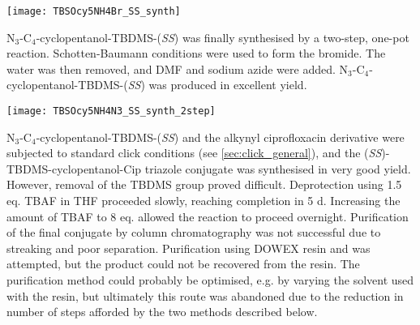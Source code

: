 \begin{scheme}[H]
	\begin{center}
		\texttt{[image: TBSOcy5NH4Br\_SS\_synth]}
		\caption{Attempted synthesis of Br-C$_4$-cyclopentanol-TBDMS-(\textit{SS}) . 
		a) , , , 0 $^{\circ}$C, 2 h. %
		\label{sch:TBSOcy5NH4Br_SS_synth}}
	\end{center}
\end{scheme}


N$_3$-C$_4$-cyclopentanol-TBDMS-(\textit{SS})  was finally synthesised by a two-step, one-pot reaction. Schotten-Baumann conditions were used to form the bromide. The water was then removed, and DMF and sodium azide were added. N$_3$-C$_4$-cyclopentanol-TBDMS-(\textit{SS})  was produced in excellent yield.

\begin{scheme}[H]
	\begin{center}
				
		\texttt{[image: TBSOcy5NH4N3\_SS\_synth\_2step]}
		\caption{
		Synthesis of N$_3$-C$_4$-cyclopentanol-TBDMS-(\textit{SS}) .
		a) , , , 0 $^{\circ}$C, 3 h.
		b) , DMF, , r.t., 3 h. 
		99.2 \% over 2 steps. %
		\label{sch:TBSOcy5NH4N3_SS_synth_2step}}
	\end{center}
\end{scheme}


N$_3$-C$_4$-cyclopentanol-TBDMS-(\textit{SS})  and the alkynyl ciprofloxacin derivative  were subjected to standard click conditions (see \ref{sec:click_general}), and the (\textit{SS})-TBDMS-cyclopentanol-Cip triazole conjugate  was synthesised in very good yield. However, removal of the TBDMS group proved difficult. Deprotection using 1.5 eq. TBAF in THF proceeded slowly, reaching completion in 5 d. Increasing the amount of TBAF to 8 eq. allowed the reaction to proceed overnight.
Purification of the final conjugate  by column chromatography was not successful due to streaking and poor separation. Purification using DOWEX resin and \cite{Kaburagi2007} was attempted, but the product could not be recovered from the resin.
The purification method could probably be optimised, e.g. by varying the solvent used with the resin, but ultimately this route was abandoned due to the reduction in number of steps afforded by the two methods described below.

